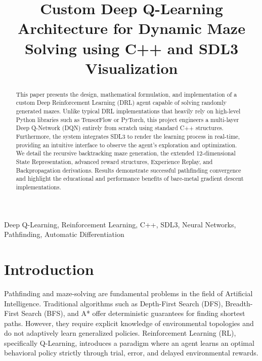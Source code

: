 \documentclass[conference]{IEEEtran}
\begin{document}
\title{Custom Deep Q-Learning Architecture for Dynamic Maze Solving using C++ and SDL3 Visualization}

\author{
}

\maketitle

\begin{abstract}
This paper presents the design, mathematical formulation, and implementation of a custom Deep Reinforcement Learning (DRL) agent capable of solving randomly generated mazes. Unlike typical DRL implementations that heavily rely on high-level Python libraries such as TensorFlow or PyTorch, this project engineers a multi-layer Deep Q-Network (DQN) entirely from scratch using standard C++ structures. Furthermore, the system integrates SDL3 to render the learning process in real-time, providing an intuitive interface to observe the agent's exploration and optimization. We detail the recursive backtracking maze generation, the extended 12-dimensional State Representation, advanced reward structures, Experience Replay, and Backpropagation derivations. Results demonstrate successful pathfinding convergence and highlight the educational and performance benefits of bare-metal gradient descent implementations.
\end{abstract}

\begin{IEEEkeywords}
Deep Q-Learning, Reinforcement Learning, C++, SDL3, Neural Networks, Pathfinding, Automatic Differentiation
\end{IEEEkeywords}

\section{Introduction}
Pathfinding and maze-solving are fundamental problems in the field of Artificial Intelligence. Traditional algorithms such as Depth-First Search (DFS), Breadth-First Search (BFS), and A* offer deterministic guarantees for finding shortest paths. However, they require explicit knowledge of environmental topologies and do not adaptively learn generalized policies. Reinforcement Learning (RL), specifically Q-Learning, introduces a paradigm where an agent learns an optimal behavioral policy strictly through trial, error, and delayed environmental rewards.
\end{document}
